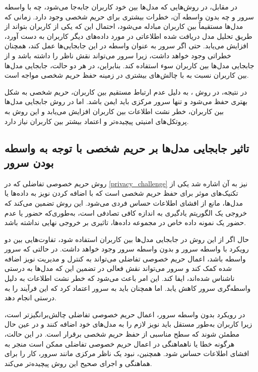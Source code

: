 در مقابل، در روش‌هایی که مدل‌ها بین خود کاربران جابه‌جا می‌شود، چه با واسطه سرور و چه بدون واسطه آن، خطرات بیشتری برای حریم شخصی وجود دارد. زمانی که مدل‌ها مستقیماً بین کاربران مبادله می‌شود، احتمال این که یکی از کاربران بتواند از طریق تحلیل مدل دریافت ‌شده اطلاعاتی در مورد داده‌های دیگر کاربران به دست آورد، افزایش می‌یابد. حتی اگر سرور به عنوان واسطه در این جابجایی‌ها عمل کند، همچنان خطراتی وجود خواهد داشت، زیرا سرور می‌تواند نقش ناظر را داشته باشد و از جابجایی مدل‌ها بین کاربران سوء استفاده کند. بنابراین، در هر دو حالت، جابجایی مدل‌ها بین کاربران نسبت به
با چالش‌های بیشتری در زمینه حفظ حریم شخصی مواجه است.

در نتیجه، در روش
%
، به دلیل عدم ارتباط مستقیم بین کاربران، حریم شخصی به شکل بهتری حفظ می‌شود و تنها سرور مرکزی باید ایمن باشد. اما در روش جابجایی مدل‌ها بین کاربران، خطر نشت اطلاعات بین کاربران افزایش می‌یابد و این روش به پروتکل‌های امنیتی پیچیده‌تر و اعتماد بیشتر بین کاربران نیاز دارد.


\subsection{
تاثیر جابجایی مدل‌ها بر حریم شخصی با توجه به واسطه بودن سرور
}
روش حریم خصوصی تفاضلی که در
\ref{privacy_challenge}
نیز به آن اشاره شد یکی از تکنیک‌های موثر برای حفظ حریم شخصی است که با اضافه کردن نویز به داده‌ها یا مدل‌ها، مانع از افشای اطلاعات حساس فردی می‌شود. این روش تضمین می‌کند که خروجی یک الگوریتم یادگیری به اندازه کافی تصادفی است، به‌طوری‌که حضور یا عدم حضور یک نمونه داده خاص در مجموعه داده‌ها، تاثیری بر خروجی نهایی نداشته باشد.

حال اگر از این روش در جابجایی مدل‌ها بین کاربران استفاده شود، تفاوت‌هایی بین دو رویکرد با واسطه سرور و بدون واسطه سرور وجود خواهد داشت. در حالتی که سرور واسطه باشد، اعمال حریم خصوصی تفاضلی می‌تواند به کنترل و مدیریت نویز اضافه شده کمک کند و سرور می‌تواند نقش فعالی در تضمین این که مدل‌ها به درستی ناشناس‌ شده‌اند، ایفا کند. این امر باعث می‌شود که خطر نشت اطلاعات به دلیل واسطه‌گری سرور کاهش یابد. اما همچنان باید به سرور اعتماد کرد که این فرآیند را به درستی انجام دهد.

در رویکرد بدون واسطه سرور، اعمال حریم خصوصی تفاضلی چالش‌برانگیزتر است، زیرا کاربران به‌طور مستقل باید نویز لازم را به مدل‌های خود اضافه کنند و در عین حال مطمئن شوند که سطح مناسبی از حفظ حریم شخصی برقرار است. در این حالت، هرگونه خطا یا ناهماهنگی در اعمال حریم خصوصی تفاضلی ممکن است منجر به افشای اطلاعات حساس شود. همچنین، نبود یک ناظر مرکزی مانند سرور، کار را برای هماهنگی و اجرای صحیح این روش پیچیده‌تر می‌کند.

